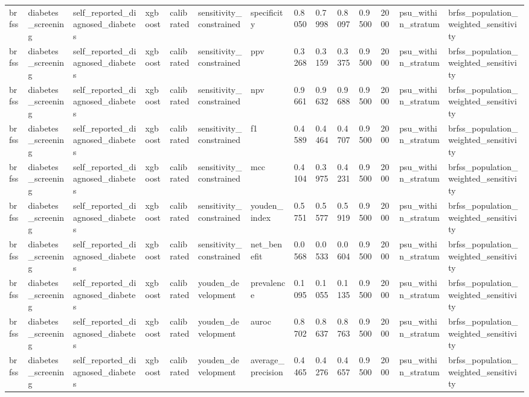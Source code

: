\begin{tabular}{llllllllllllll}
brfss & diabetes\_screening & self\_reported\_diagnosed\_diabetes & xgboost & calibrated & sensitivity\_constrained & specificity & 0.8050 & 0.7998 & 0.8097 & 0.9500 & 2000 & psu\_within\_stratum & brfss\_population\_weighted\_sensitivity \\
brfss & diabetes\_screening & self\_reported\_diagnosed\_diabetes & xgboost & calibrated & sensitivity\_constrained & ppv & 0.3268 & 0.3159 & 0.3375 & 0.9500 & 2000 & psu\_within\_stratum & brfss\_population\_weighted\_sensitivity \\
brfss & diabetes\_screening & self\_reported\_diagnosed\_diabetes & xgboost & calibrated & sensitivity\_constrained & npv & 0.9661 & 0.9632 & 0.9688 & 0.9500 & 2000 & psu\_within\_stratum & brfss\_population\_weighted\_sensitivity \\
brfss & diabetes\_screening & self\_reported\_diagnosed\_diabetes & xgboost & calibrated & sensitivity\_constrained & f1 & 0.4589 & 0.4464 & 0.4707 & 0.9500 & 2000 & psu\_within\_stratum & brfss\_population\_weighted\_sensitivity \\
brfss & diabetes\_screening & self\_reported\_diagnosed\_diabetes & xgboost & calibrated & sensitivity\_constrained & mcc & 0.4104 & 0.3975 & 0.4231 & 0.9500 & 2000 & psu\_within\_stratum & brfss\_population\_weighted\_sensitivity \\
brfss & diabetes\_screening & self\_reported\_diagnosed\_diabetes & xgboost & calibrated & sensitivity\_constrained & youden\_index & 0.5751 & 0.5577 & 0.5919 & 0.9500 & 2000 & psu\_within\_stratum & brfss\_population\_weighted\_sensitivity \\
brfss & diabetes\_screening & self\_reported\_diagnosed\_diabetes & xgboost & calibrated & sensitivity\_constrained & net\_benefit & 0.0568 & 0.0533 & 0.0604 & 0.9500 & 2000 & psu\_within\_stratum & brfss\_population\_weighted\_sensitivity \\
brfss & diabetes\_screening & self\_reported\_diagnosed\_diabetes & xgboost & calibrated & youden\_development & prevalence & 0.1095 & 0.1055 & 0.1135 & 0.9500 & 2000 & psu\_within\_stratum & brfss\_population\_weighted\_sensitivity \\
brfss & diabetes\_screening & self\_reported\_diagnosed\_diabetes & xgboost & calibrated & youden\_development & auroc & 0.8702 & 0.8637 & 0.8763 & 0.9500 & 2000 & psu\_within\_stratum & brfss\_population\_weighted\_sensitivity \\
brfss & diabetes\_screening & self\_reported\_diagnosed\_diabetes & xgboost & calibrated & youden\_development & average\_precision & 0.4465 & 0.4276 & 0.4657 & 0.9500 & 2000 & psu\_within\_stratum & brfss\_population\_weighted\_sensitivity \\

\end{tabular}
